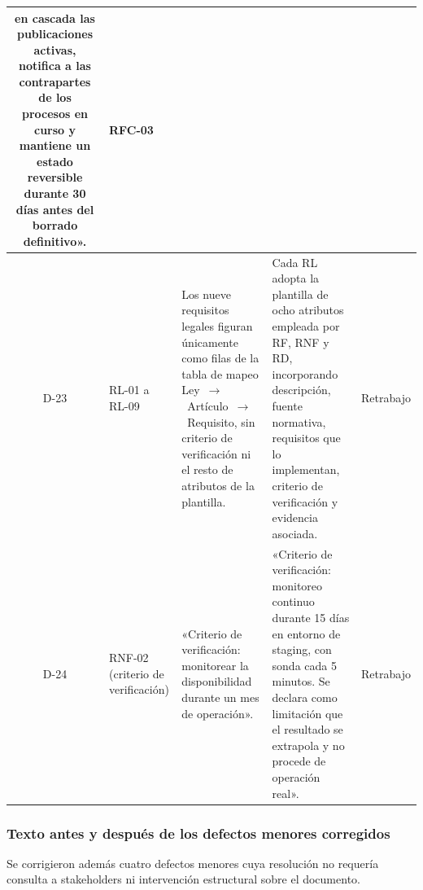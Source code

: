 \documentclass[journal,onecolumn]{IEEEtran}
\begin{document}
\begin{longtable}{
			|c
			|>{\raggedright\arraybackslash}p{2.3cm}
			|>{\raggedright\arraybackslash}p{5.5cm}
			|>{\raggedright\arraybackslash}p{5.5cm}
			|>{\raggedright\arraybackslash}p{1.6cm}|
		}
		en cascada las publicaciones activas, notifica a las contrapartes de
		los procesos en curso y mantiene un estado reversible durante 30 días
		antes del borrado definitivo». & RFC-03 \\
		\hline
		D-23 & RL-01 a RL-09 &
		Los nueve requisitos legales figuran únicamente como filas de
		la tabla de mapeo Ley~$\rightarrow$~Artículo~$\rightarrow$~Requisito,
		sin criterio de verificación ni el resto de atributos de la
		plantilla. &
		Cada RL adopta la plantilla de ocho atributos empleada por RF,
		RNF y RD, incorporando descripción, fuente normativa, requisitos que lo
		implementan, criterio de verificación y evidencia asociada. & Retrabajo \\
		\hline
		D-24 & RNF-02 (criterio de verificación) &
		«Criterio de verificación: monitorear la disponibilidad durante
		un mes de operación». &
		«Criterio de verificación: monitoreo continuo durante 15 días
		en entorno de staging, con sonda cada 5 minutos. Se declara como
		limitación que el resultado se extrapola y no procede de operación
		real». & Retrabajo \\
	\end{longtable}
	
	\subsubsection{Texto antes y después de los defectos menores corregidos}
	
	Se corrigieron además cuatro defectos menores cuya resolución no requería
	consulta a stakeholders ni intervención estructural sobre el documento.
	
\end{document}
